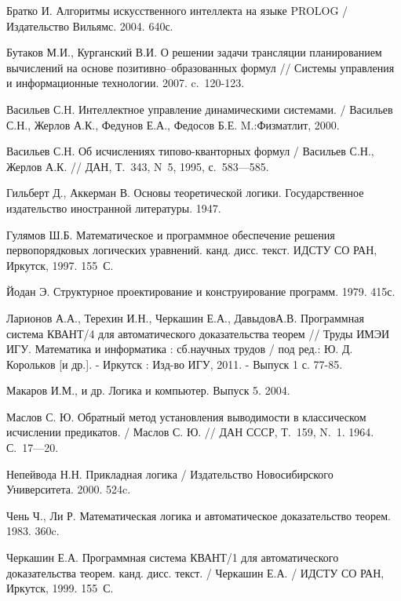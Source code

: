 \begin{thebibliography}{99}

%
%

 Братко И. Алгоритмы искусственного интеллекта на языке PROLOG / Издательство Вильямс. 2004. 640с.

 Бутаков М.И., Курганский В.И. О решении задачи трансляции планированием вычислений на основе позитивно--образованных формул // Системы управления и информационные технологии. 2007. c.~120-123.

 Васильев С.Н. Интеллектное управление динамическими системами. / Васильев С.Н., Жерлов А.К., Федунов Е.А., Федосов Б.Е.  M.:Физматлит, 2000.

 Васильев С.Н. Об исчислениях типово-кванторных формул / Васильев С.Н., Жерлов А.К.  // ДАН, Т.~343, N~5, 1995, с.~583---585.

 Гильберт Д., Аккерман В. Основы теоретической логики. Государственное издательство иностранной литературы. 1947.

 Гулямов Ш.Б. Математическое и программное обеспечение решения первопорядковых логических уравнений. канд. дисс. текст. ИДСТУ СО РАН, Иркутск, 1997. 155~С.

 Йодан Э. Структурное проектирование и конструирование программ. 1979. 415с.

 Ларионов А.А., Терехин И.Н., Черкашин Е.А., ДавыдовА.В.
Программная система КВАНТ/4 для автоматического доказательства теорем
// Труды ИМЭИ ИГУ. Математика и информатика : сб.научных трудов / под
ред.: Ю. Д. Корольков [и др.]. - Иркутск : Изд-во ИГУ, 2011. - Выпуск
1 с. 77-85.

 Макаров И.М., и др. Логика и компьютер. Выпуск 5. 2004.

 Маслов С. Ю. Обратный метод установления выводимости в классическом исчислении предикатов. / Маслов С. Ю. // ДАН СССР, Т.~159, N.~1. 1964. С.~17---20.

 Непейвода Н.Н. Прикладная логика / Издательство Новосибирского Университета. 2000. 524c.

 Чень Ч., Ли Р. Математическая логика и автоматическое доказательство теорем. 1983. 360c.

 Черкашин Е.А. Программная система КВАНТ/1 для автоматического доказательства теорем. канд. дисс. текст. / Черкашин Е.А. / ИДСТУ СО РАН, Иркутск, 1999. 155~С.


\end{thebibliography}
